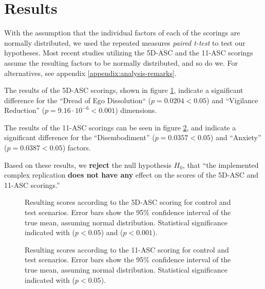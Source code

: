 \section{Results}

With the assumption that the individual factors of each of the scorings are normally distributed, we used the repeated measures \textit{paired t-test} to test our hypotheses. Most recent studies utilizing the \ac{5D-ASC} and the \ac{11-ASC} scorings assume the resulting factors to be normally distributed, and so do we. For alternatives, see appendix \ref{appendix:analysis-remarks}.

The results of the \ac{5D-ASC} scorings, shown in figure \ref{fig:results-5d-asc}, indicate a significant difference for the ``Dread of Ego Dissolution`` ($p = 0.0204 < 0.05$) and ``Vigilance Reduction'' ($p = 9.16 \cdot 10^{-6} < 0.001$) dimensions.

The results of the \ac{11-ASC} scorings can be seen in figure \ref{fig:results-11-asc}, and indicate a significant difference for the ``Disembodiment'' ($p = 0.0357 < 0.05$) and ``Anxiety'' ($p = 0.0387 < 0.05$) factors.

Based on these results, we \textbf{reject} the null hypothesis $H_0$, that ``the implemented complex replication \textbf{does not have any} effect on the scores of the \ac{5D-ASC} and \ac{11-ASC} scorings.''

\begin{figure}[H]
    \centering
    \ifgraphics
    \fi
    \caption{
        Resulting scores according to the \ac{5D-ASC} scoring for control and test scenarios.
        Error bars show the 95\% confidence interval of the true mean, assuming normal distribution.
        Statistical significance indicated with \raisebox{-0.7ex}{*} ($p < 0.05$) and \raisebox{-0.7ex}{***} ($p < 0.001$).
    }
    \label{fig:results-5d-asc}
\end{figure}

\begin{figure}[H]
    \centering
    \ifgraphics
    \fi
    \caption{
        Resulting scores according to the \ac{11-ASC} scoring for control and test scenarios.
        Error bars show the 95\% confidence interval of the true mean, assuming normal distribution.
        Statistical significance indicated with \raisebox{-0.7ex}{*} ($p < 0.05$).
    }
    \label{fig:results-11-asc}
\end{figure}
